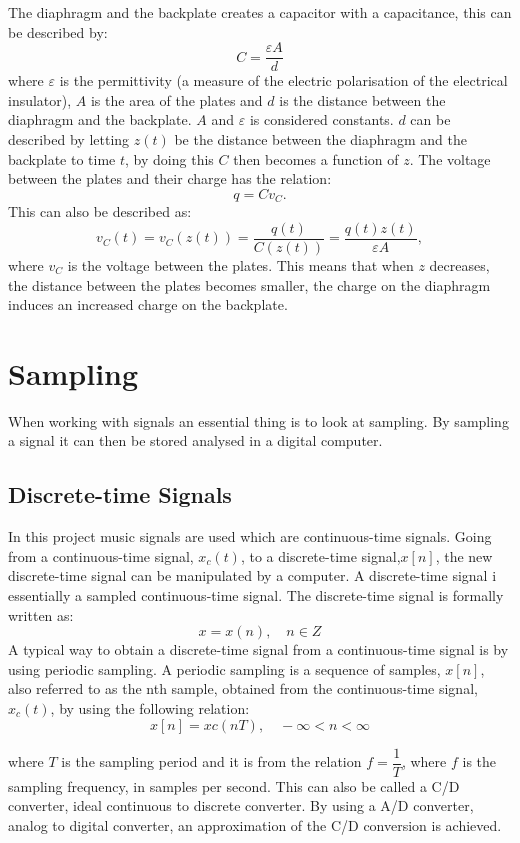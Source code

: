 \noindent The diaphragm and the backplate creates a capacitor with a capacitance, this can be described by:
$$ C = \dfrac{\varepsilon A}{d}$$ 
\indent where $\varepsilon$ is the permittivity (a measure of the electric polarisation of the electrical insulator), $A$ is the area of the plates and $d$ is the distance between the diaphragm and the backplate. $A$ and $\varepsilon$ is considered constants. $d$ can be described by letting $z(t)$ be the distance between the diaphragm and the backplate to time $t$, by doing this $C$ then becomes a function of $z$. The voltage between the plates and their charge has the relation:
$$q=C v_C.$$
This can also be described as:
$$v_C(t)=v_C(z(t))= \dfrac{q(t)}{C(z(t))} = \dfrac{q(t)z(t)}{\varepsilon A},$$
\indent where $v_C$ is the voltage between the plates. This means that when $z$ decreases, the distance between the plates becomes smaller, the charge on the diaphragm induces an increased charge on the backplate. 
\cite[p. 160-161]{LectureNotes}


\section{Sampling}
When working with signals an essential thing is to look at sampling. By sampling a signal it can then be stored analysed in a digital computer.\\ 



\subsection{Discrete-time Signals}
In this project music signals are used which are continuous-time signals. Going from a continuous-time signal, $x_c(t)$, to a discrete-time signal,$x[n]$, the new discrete-time signal can be manipulated by a computer. A discrete-time signal i essentially a sampled continuous-time signal. The discrete-time signal is formally written as:
$$x={x(n)}, \quad    n \in Z$$
A typical way to obtain a discrete-time signal from a continuous-time signal is by using periodic sampling. A periodic sampling is a sequence of samples, $x[n]$, also referred to as the nth sample, obtained from the continuous-time signal,$x_c(t)$, by using the following relation:
$$x[n]=xc (nT), \quad    - \infty <n< \infty$$

where $T$ is the sampling period and it is from the relation $f=\dfrac{1}{T}$, where $f$ is the sampling frequency, in samples per second. This can also be called a C/D converter, ideal continuous to discrete converter. 
By using a A/D converter, analog to digital converter, an approximation of the C/D conversion is achieved. \cite[p. 140-142]{DiscreteTimeSignal}

